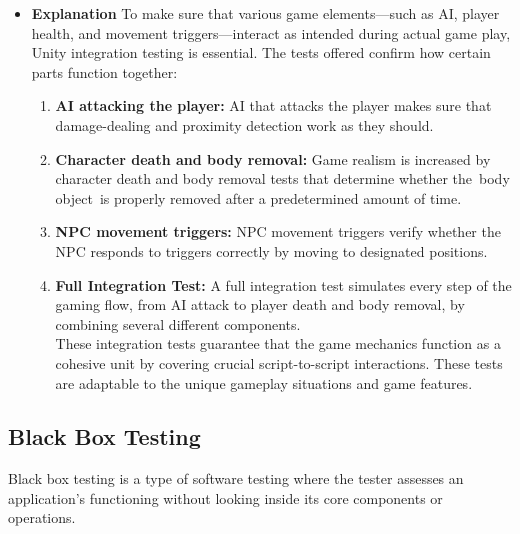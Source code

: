 \begin{itemize}
	\item  \textbf{Explanation}
	To make sure that various game elements—such as AI, player health, and movement triggers—interact as intended during actual game play, Unity integration testing is essential. The tests offered confirm how certain parts function together:
	\begin{enumerate}
		\item \textbf{AI attacking the player:} AI that attacks the player makes sure that damage-dealing and proximity detection work as they should.
		\item \textbf{Character death and body removal:} Game realism is increased by character death and body removal tests that determine whether the body object is properly removed after a predetermined amount of time.
		\item \textbf{NPC movement triggers:} NPC movement triggers verify whether the NPC responds to triggers correctly by moving to designated positions.
		\item \textbf{Full Integration Test:} A full integration test simulates every step of the gaming flow, from AI attack to player death and body removal, by combining several different components.\\
		These integration tests guarantee that the game mechanics function as a cohesive unit by covering crucial script-to-script interactions. These tests are adaptable to the unique gameplay situations and game features.
	\end{enumerate}
\end{itemize}
\subsection{Black Box Testing}
Black box testing is a type of software testing where the tester assesses an application's functioning without looking inside its core components or operations.
